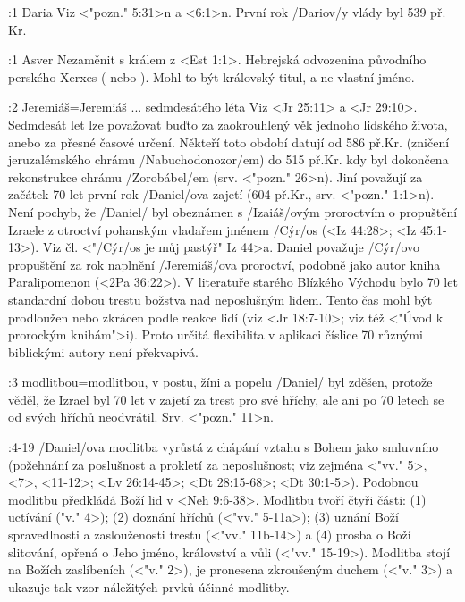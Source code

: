 :1 {Daria} Viz <"pozn." 5:31>n a <6:1>n. První rok \x/Dariov/y vlády byl 539 př. Kr.


:1 {Asver} Nezaměnit s králem z <Est 1:1>.  Hebrejská odvozenina původního perského Xerxes ( nebo ). Mohl to být královský titul, a ne vlastní jméno. 

:2 {Jeremiáš}={Jeremiáš ... sedmdesátého léta} Viz <Jr 25:11> a <Jr 29:10>.
        Sedmdesát let lze považovat buďto za zaokrouhlený věk jednoho lidského života, anebo za přesné časové určení. Někteří toto období datují od 586 př.Kr. (zničení jeruzalémského chrámu \x/Nabuchodonozor/em) do 515 př.Kr. kdy byl dokončena rekonstrukce chrámu 
        \x/Zorobábel/em (srv. <"pozn." 26>n). Jiní považují za začátek 70 let první rok \x/Daniel/ova zajetí (604 př.Kr., srv. <"pozn." 1:1>n). 
        Není pochyb, že \x/Daniel/ byl obeznámen s \x/Izaiáš/ovým proroctvím o propuštění Izraele z otroctví pohanským vladařem jménem  \x/Cýr/os (<Iz 44:28>; <Iz 45:1-13>).
        Viz čl. <"\x/Cýr/os je můj pastýř" Iz 44>a.
        Daniel považuje \x/Cýr/ovo propuštění za rok naplnění \x/Jeremiáš/ova proroctví, podobně jako autor kniha Paralipomenon 
        (<2Pa 36:22>). V literatuře starého Blízkého Východu bylo 70 let standardní dobou trestu božstva nad neposlušným lidem. Tento čas mohl být prodloužen nebo zkrácen podle reakce lidí (viz <Jr 18:7-10>; viz též <"Úvod k prorockým knihám">i). Proto  určitá flexibilita  v aplikaci číslice 70 různými biblickými autory není překvapivá.
        
        
:3 {modlitbou}={modlitbou, v postu, žíni a popelu} \x/Daniel/ byl zděšen, protože věděl, že Izrael byl 70 let v zajetí za trest pro své hříchy, ale ani po 70 letech se od svých hříchů neodvrátil. Srv. <"pozn." 11>n.

:4-19 {} \x/Daniel/ova modlitba vyrůstá z chápání vztahu s Bohem jako smluvního (požehnání za poslušnost a prokletí za neposlušnost; viz zejména <"vv." 5>, <7>, <11-12>; <Lv 26:14-45>; <Dt 28:15-68>; <Dt 30:1-5>). Podobnou modlitbu předkládá Boží lid v <Neh 9:6-38>. Modlitbu tvoří čtyři části: (1) uctívání (\<"v." 4>);  (2) doznání hříchů (<"vv." 5-11a>); (3) uznání Boží spravedlnosti a zaslouženosti trestu (<"vv." 11b-14>) a (4) prosba o Boží slitování, opřená o Jeho jméno, království a vůli (<"vv." 15-19>). Modlitba stojí na Božích zaslíbeních (<"v." 2>), je pronesena zkroušeným duchem (<"v." 3>) a ukazuje tak vzor náležitých prvků účinné modlitby.

